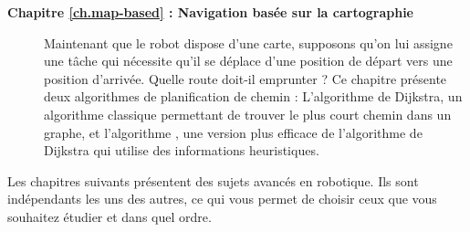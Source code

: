 \begin{description}
\smallskip
\item [\textbf{Chapitre \ref{ch.map-based} : Navigation basée sur la cartographie}] Maintenant que le robot dispose d'une carte, supposons qu'on lui assigne une tâche qui nécessite qu'il se déplace d'une position de départ vers une position d'arrivée. Quelle route doit-il emprunter ? Ce chapitre présente deux algorithmes de planification de chemin : L'algorithme de Dijkstra, un algorithme classique permettant de trouver le plus court chemin dans un graphe, et l'algorithme \astar{}, 
une version plus efficace de l'algorithme de Dijkstra qui utilise des informations heuristiques.
\end{description}

Les chapitres suivants présentent des sujets avancés en robotique. Ils sont indépendants les uns des autres, ce qui vous permet de choisir ceux que vous souhaitez étudier et dans quel ordre.
